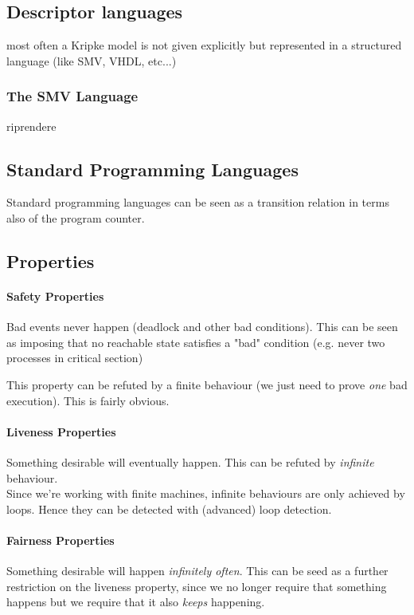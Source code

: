 \documentclass{article}
\begin{document}
\subsection{Descriptor languages}
most often a Kripke model is not given explicitly but represented in a structured language (like SMV, VHDL, etc...)

\subsubsection{The SMV Language}
\begin{callout}{riprendere}\end{callout}

\subsection{Standard Programming Languages}
Standard programming languages can be seen as a transition relation in terms also of the program counter.

\subsection{Properties}
\paragraph{Safety Properties}
Bad events never happen (deadlock and other bad conditions). This can be seen as imposing that no reachable state satisfies a "bad" condition (e.g. never two processes in critical section)

This property can be refuted by a finite behaviour (we just need to prove \textit{one} bad execution). This is fairly obvious.

\paragraph{Liveness Properties}
Something desirable will eventually happen. This can be refuted by \textit{infinite} behaviour.\\
Since we're working with finite machines, infinite behaviours are only achieved by loops. Hence they can be detected with (advanced) loop detection.

\paragraph{Fairness Properties}
Something desirable will happen \textit{infinitely often}. This can be seed as a further restriction on the liveness property, since we no longer require that something happens but we require that it also \textit{keeps} happening.
\end{document}
